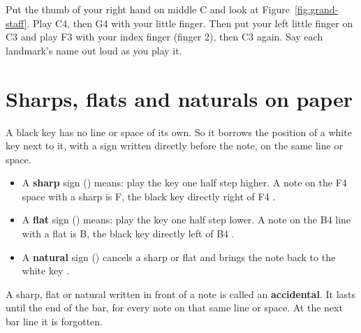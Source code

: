\begin{tryitbox}
Put the thumb of your right hand on middle C and look at Figure~\ref{fig:grand-staff}. Play C4, then G4 with your little finger. Then put your left little finger on C3 and play F3 with your index finger (finger 2), then C3 again. Say each landmark's name out loud as you play it.
\end{tryitbox}

\section{Sharps, flats and naturals on paper}

A black key has no line or space of its own. So it borrows the position of a white key next to it, with a sign written directly before the note, on the same line or space.
\begin{itemize}
  \item A \textbf{sharp} sign (\sh) means: play the key one half step higher. A note on the F4 space with a sharp is F, the black key directly right of F4 .
  \item A \textbf{flat} sign (\fl) means: play the key one half step lower. A note on the B4 line with a flat is B, the black key directly left of B4 .
  \item A \textbf{natural} sign (\nat) cancels a sharp or flat and brings the note back to the white key .
\end{itemize}

A sharp, flat or natural written in front of a note is called an \textbf{accidental}. It lasts until the end of the bar, for every note on that same line or space. At the next bar line it is forgotten.

